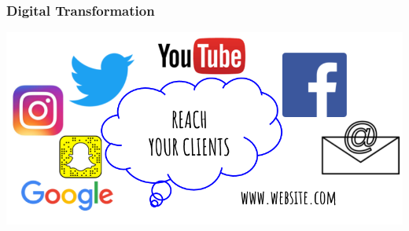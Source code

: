 \begin{frame}
\frametitle{Digital Transformation}
\vskip 1.1cm
\includegraphics[width=1.0\textwidth]{./pictures/reachClients.png}
\end{frame}

